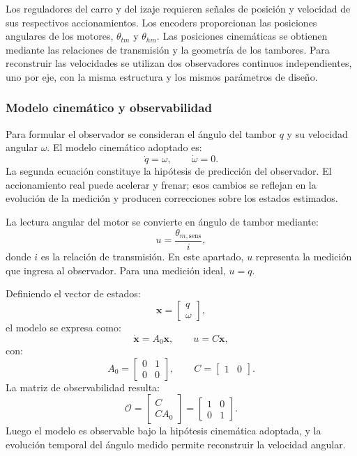 \documentclass[a4paper,10pt,onecolumn,journal]{ieeeconf}
\numberwithin{equation}{section}
\begin{document}
Los reguladores del carro y del izaje requieren señales de posición y velocidad de sus respectivos accionamientos. Los encoders proporcionan las posiciones angulares de los motores, $\theta_{tm}$ y $\theta_{hm}$. Las posiciones cinemáticas se obtienen mediante las relaciones de transmisión y la geometría de los tambores. Para reconstruir las velocidades se utilizan dos observadores continuos independientes, uno por eje, con la misma estructura y los mismos parámetros de diseño.


\subsubsection{Modelo cinemático y observabilidad}

Para formular el observador se consideran el ángulo del tambor $q$ y su velocidad angular $\omega$. El modelo cinemático adoptado es:
\begin{equation}
\dot q=\omega,\qquad \dot\omega=0.
\end{equation}
La segunda ecuación constituye la hipótesis de predicción del observador. El accionamiento real puede acelerar y frenar; esos cambios se reflejan en la evolución de la medición y producen correcciones sobre los estados estimados.

La lectura angular del motor se convierte en ángulo de tambor mediante:
\begin{equation}
u=\frac{\theta_{m,\mathrm{sens}}}{i},
\end{equation}
donde $i$ es la relación de transmisión. En este apartado, $u$ representa la medición que ingresa al observador. Para una medición ideal, $u=q$.

Definiendo el vector de estados:
\begin{equation}
\boldsymbol x=\begin{bmatrix}q\\\omega\end{bmatrix},
\end{equation}
el modelo se expresa como:
\begin{equation}
\dot{\boldsymbol x}=A_0\boldsymbol x,\qquad u=C\boldsymbol x,
\end{equation}
con:
\begin{equation}
A_0=\begin{bmatrix}0&1\\0&0\end{bmatrix},\qquad
C=\begin{bmatrix}1&0\end{bmatrix}.
\end{equation}
La matriz de observabilidad resulta:
\begin{equation}
\mathcal O=\begin{bmatrix}C\\CA_0\end{bmatrix}
=\begin{bmatrix}1&0\\0&1\end{bmatrix}.
\end{equation}
Luego el modelo es observable bajo la hipótesis cinemática adoptada, y la evolución temporal del ángulo medido permite reconstruir la velocidad angular.
\end{document}

